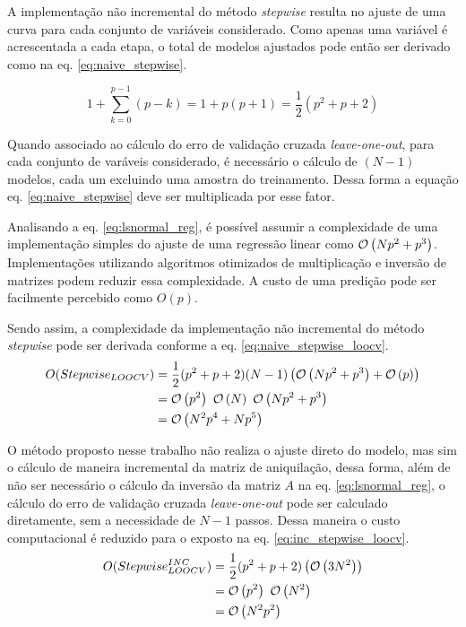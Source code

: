 A implementação não incremental do método \textit{stepwise} resulta no ajuste de uma curva para cada conjunto de variáveis considerado. Como apenas uma variável é acrescentada a cada etapa, o total de modelos ajustados pode então ser derivado como na eq. \ref{eq:naive_stepwise}.

\begin{equation}
    1 + \sum^{p-1}_{k=0} (p-k) = 1+p(p+1) = \frac{1}{2}(p^2+p+2)
    \label{eq:naive_stepwise} 
\end{equation}

Quando associado ao cálculo do erro de validação cruzada \textit{leave-one-out}, para cada conjunto de varáveis considerado, é necessário o cálculo de $(N-1)$ modelos, cada um excluindo uma amostra do treinamento. Dessa forma a equação eq. \ref{eq:naive_stepwise} deve ser multiplicada por esse fator.

Analisando a eq. \ref{eq:lsnormal_reg}, é possível assumir a complexidade de uma implementação simples do ajuste de uma regressão linear como $\mathcal{O}\left(Np^2 + p^3\right)$. Implementações utilizando algoritmos otimizados de multiplicação e inversão de matrizes podem reduzir essa complexidade. A custo de uma predição pode ser facilmente percebido como $O(p)$.

Sendo assim, a complexidade da implementação não incremental do método \textit{stepwise} pode ser derivada conforme a eq. \ref{eq:naive_stepwise_loocv}.
\begin{equation}
    \begin{split}
        O(Stepwise_{LOOCV}) &= \frac{1}{2}(p^2+p+2)(N-1)\left( \mathcal{O}\left(Np^2 + p^3\right)+\mathcal{O}\left(p\right)\right) \\
                            &= \mathcal{O}\left(p^2\right)\ \mathcal{O}\left(N\right)\ \mathcal{O}\left(Np^2 + p^3\right) \\
                            &= \mathcal{O}\left(N^2p^4 + Np^5\right)
    \end{split}
    \label{eq:naive_stepwise_loocv}
\end{equation}

O método proposto nesse trabalho não realiza o ajuste direto do modelo, mas sim o cálculo de maneira incremental da matriz de aniquilação, dessa forma, além de não ser necessário o cálculo da inversão da matriz $A$ na eq. \ref{eq:lsnormal_reg}, o cálculo do erro de validação cruzada \textit{leave-one-out} pode ser calculado diretamente, sem a necessidade de $N-1$ passos. Dessa maneira o custo computacional é reduzido para o exposto na eq. \ref{eq:inc_stepwise_loocv}.
\begin{equation}
    \begin{split}
        O(Stepwise_{LOOCV}^{INC}) &= \frac{1}{2}(p^2+p+2)\left( \mathcal{O}\left(3 N^2\right)\right)\\
                            &= \mathcal{O}\left(p^2\right)\ \mathcal{O}\left(N^2\right) \\
                            &= \mathcal{O}\left(N^2p^2\right)
    \end{split}
    \label{eq:inc_stepwise_loocv}
\end{equation}

